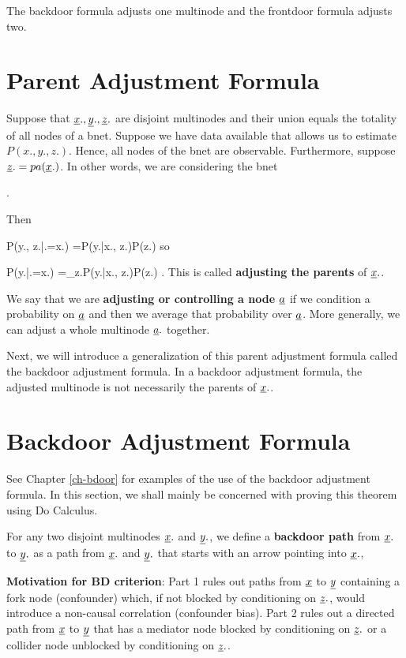 The
backdoor formula
adjusts one multinode
and the
frontdoor formula adjusts two.



\section{Parent Adjustment Formula}


Suppose
that $\rvx., \rvy., \rvz.$
are disjoint multinodes
and their union equals
 the
totality of all nodes of
a bnet.
Suppose we have data
available that allows us  to
estimate $P(x., y., z.)$.
Hence, all nodes of the bnet
are observable.
Furthermore,
suppose $\rvz.=pa(\rvx.)$.
In other words,
we are
considering the bnet

\beq
{}
\;.
\eeq

Then

\beq
P(y., z.|\cald \rvx.=x.)
=P(y.|x., z.)P(z.)
\eeq
so

\beq
P(y.|\cald \rvx.=x.)
=\sum_{z.}P(y.|x., z.)P(z.)
\;.
\eeq
This is called
{\bf adjusting the parents}
of $\rvx.$.


We say that
we are {\bf adjusting
or controlling a node $\rva$}
if we condition
a probability on $\rva$ and
then we average
that probability over $\rva$.
More generally,
we can adjust a whole
multinode $\rva.$ together.

Next,
we will introduce
a generalization
of
this parent adjustment formula
called the
backdoor adjustment formula.
In a backdoor adjustment formula,
the adjusted multinode
is not necessarily
 the parents of $\rvx.$.

\section{Backdoor Adjustment Formula}

See Chapter \ref{ch-bdoor}
for examples of the use of the
backdoor adjustment formula.
In this section,
we shall mainly be
concerned with
proving this
theorem
using Do Calculus.

For any two
disjoint
multinodes $\rvx.$
and $\rvy.$,
we define a {\bf backdoor path}
from $\rvx.$ to $\rvy.$
as a path from $\rvx.$
and $\rvy.$ that
starts with an arrow pointing into
$\rvx.$,

\bdoordef

{\bf Motivation for BD criterion}:
Part 1 rules out
paths
from $\rvx$
to $\rvy$
containing a fork node (confounder)
which, if not blocked by conditioning on $\rvz.$,
 would introduce a
non-causal correlation
(confounder bias).
Part 2 rules out
a directed path
from $\rvx$ to $\rvy$
that has a mediator node
blocked by conditioning on $\rvz.$
or a collider node
unblocked by conditioning on $\rvz.$.



